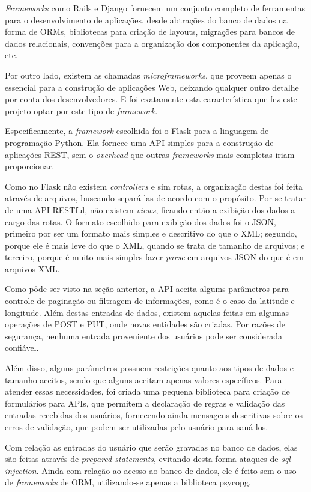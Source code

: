 \documentclass[diss]{template/setrem}
\begin{document}
\emph{Frameworks} como Rails e Django fornecem um conjunto completo de ferramentas para o desenvolvimento de aplicações, desde abtrações do banco de dados na forma de ORMs, bibliotecas para criação de layouts, migrações para bancos de dados relacionais, convenções para a organização dos componentes da aplicação, etc.

Por outro lado, existem as chamadas \emph{microframeworks}, que proveem apenas o essencial para a construção de aplicações Web, deixando qualquer outro detalhe por conta dos desenvolvedores. E foi exatamente esta característica que fez este projeto optar por este tipo de \emph{framework}.

Especificamente, a \emph{framework} escolhida foi o Flask para a linguagem de programação Python. Ela fornece uma API simples para a construção de aplicações REST, sem o \emph{overhead} que outras \emph{frameworks} mais completas iriam proporcionar.

Como no Flask não existem \emph{controllers} e sim rotas, a organização destas foi feita através de arquivos, buscando separá-las de acordo com o propósito. Por se tratar de uma API RESTful, não existem \emph{views}, ficando então a exibição dos dados a cargo das rotas. O formato escolhido para exibição dos dados foi o JSON, primeiro por ser um formato mais simples e descritivo do que o XML; segundo, porque ele é mais leve do que o XML, quando se trata de tamanho de arquivos; e terceiro, porque é muito mais simples fazer \emph{parse} em arquivos JSON do que é em arquivos XML.

Como pôde ser visto na seção anterior, a API aceita algums parâmetros para controle de paginação ou filtragem de informações, como é o caso da latitude e longitude. Além destas entradas de dados, existem aquelas feitas em algumas operações de POST e PUT, onde novas entidades são criadas. Por razões de segurança, nenhuma entrada proveniente dos usuários pode ser considerada confiável.

Além disso, alguns parâmetros possuem restrições quanto aos tipos de dados e tamanho aceitos, sendo que alguns aceitam apenas valores específicos. Para atender essas necessidades, foi criada uma pequena biblioteca para criação de formulários para APIs, que permitem a declaração de regras e validação das entradas recebidas dos usuários, fornecendo ainda mensagens descritivas sobre os erros de validação, que podem ser utilizadas pelo usuário para saná-los.

Com relação as entradas do usuário que serão gravadas no banco de dados, elas são feitas através de \emph{prepared statements}, evitando desta forma ataques de \emph{sql injection}. Ainda com relação ao acesso ao banco de dados, ele é feito sem o uso de \emph{frameworks} de ORM, utilizando-se apenas a biblioteca psycopg.
\end{document}
